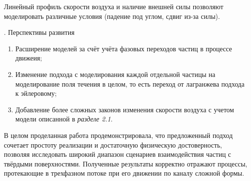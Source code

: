 Линейный профиль скорости воздуха и наличие внешней силы позволяют моделировать различные условия (падение под углом, сдвиг из-за силы).

. Перспективы развития

\begin{enumerate}
	\item Расширение моделей за счёт учёта фазовых переходов частиц в процессе движеия;
	\item Изменение подхода с моделирования каждой отдельной частицы на моделирование поля течения в целом, то есть переход от лагранжева подхода к эйлеровому;
	\item Добавление более сложных законов изменения скорости воздуха с учетом модели описанной в \textit{разделе 2.1}.
\end{enumerate}

В целом проделанная работа продемонстрировала, что предложенный подход сочетает простоту реализации и достаточную физическую достоверность, позволяя исследовать широкий диапазон сценариев взаимодействия частиц с твёрдыми поверхностями. Полученные результаты корректно отражают процессы, протекающие в трехфазном потоке при его движении по каналу сложной формы. 
